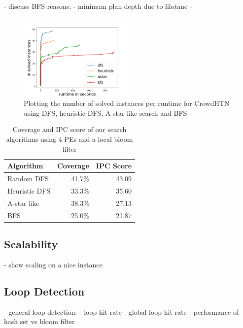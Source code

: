 - discuss BFS reasons:
	- minimum plan depth due to lilotane
	- 
\begin{figure}
	\caption{Plotting the number of solved instances per runtime for CrowdHTN using DFS, heuristic DFS, A-star like search and BFS}
	\label{figure: eval algorithm}
	\centering
	\includegraphics[width=0.5\textwidth]{images/final/search_algorithms.png}
\end{figure}
\begin{table}
	\caption{Coverage and IPC score of our search algorithms using 4 PEs and a local bloom filter}
	\label{table: eval algorithm}
	\centering
	\begin{tabular}{| l | r | r |}
		\hline
		Algorithm 		& Coverage & IPC Score \\
		\hline
		Random DFS 		& 41.7\%	& 43.09 \\ %
		Heuristic DFS 	& 33.3\%	& 35.60	\\ %
		A-star like 	& 38.3\%	& 27.13 \\ %
		BFS 			& 25.0\%	& 21.87	\\ %
		\hline
	\end{tabular}
\end{table}

\subsection{Scalability}
- show scaling on a nice instance

\subsection{Loop Detection}
- general loop detection:
- loop hit rate
- global loop hit rate
- performance of hash set vs bloom filter

